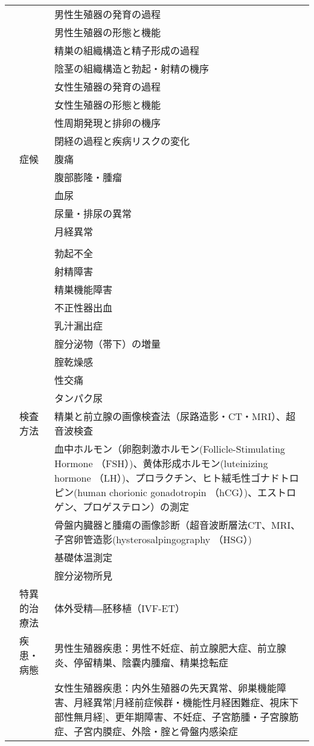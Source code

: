 \begin{xltabular}{\linewidth}{XXX}
 &  & 男性生殖器の発育の過程 \\
 &  & 男性生殖器の形態と機能 \\
 &  & 精巣の組織構造と精子形成の過程 \\
 &  & 陰茎の組織構造と勃起・射精の機序 \\
 &  & 女性生殖器の発育の過程 \\
 &  & 女性生殖器の形態と機能 \\
 &  & 性周期発現と排卵の機序 \\
 &  & 閉経の過程と疾病リスクの変化 \\
 & 症候 & 腹痛 \\
 &  & 腹部膨隆・腫瘤 \\
 &  & 血尿 \\
 &  & 尿量・排尿の異常 \\
 &  & 月経異常 \\
 &  &  \\
 &  & 勃起不全 \\
 &  & 射精障害 \\
 &  & 精巣機能障害 \\
 &  & 不正性器出血 \\
 &  & 乳汁漏出症 \\
 &  & 腟分泌物（帯下）の増量 \\
 &  & 腟乾燥感 \\
 &  & 性交痛 \\
 &  & タンパク尿 \\
 & 検査方法 & 精巣と前立腺の画像検査法（尿路造影・CT・MRI）、超音波検査 \\
 &  & 血中ホルモン（卵胞刺激ホルモン(Follicle-Stimulating Hormone （FSH）)、黄体形成ホルモン(luteinizing hormone （LH）)、プロラクチン、ヒト絨毛性ゴナドトロピン(human chorionic gonadotropin （hCG）)、エストロゲン、プロゲステロン）の測定 \\
 &  & 骨盤内臓器と腫瘍の画像診断（超音波断層法CT、MRI、子宮卵管造影(hysterosalpingography （HSG）) \\
 &  & 基礎体温測定 \\
 &  & 腟分泌物所見 \\
 & 特異的治療法 & 体外受精―胚移植（IVF-ET） \\
 & 疾患・病態 & 男性生殖器疾患：男性不妊症、前立腺肥大症、前立腺炎、停留精巣、陰嚢内腫瘤、精巣捻転症 \\
 &  & 女性生殖器疾患：内外生殖器の先天異常、卵巣機能障害、月経異常[月経前症候群・機能性月経困難症、視床下部性無月経]、更年期障害、不妊症、子宮筋腫・子宮腺筋症、子宮内膜症、外陰・腟と骨盤内感染症 \\

\end{xltabular}
